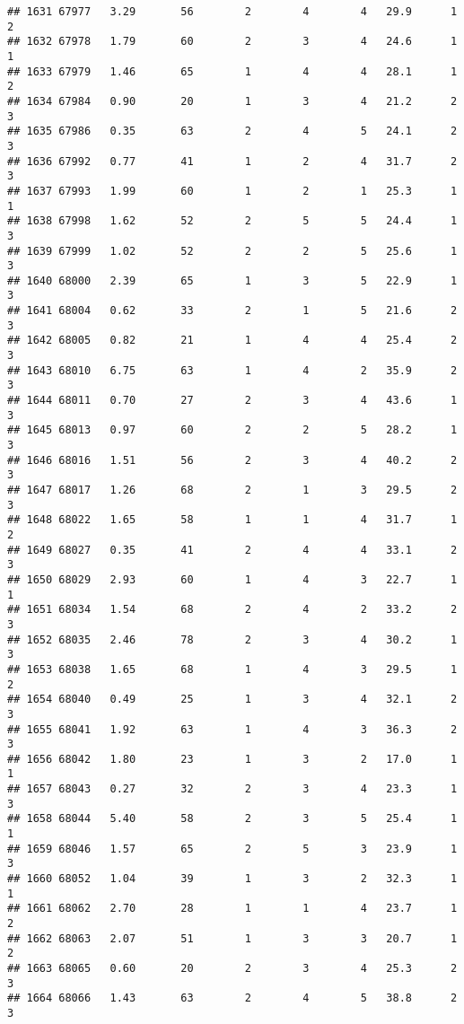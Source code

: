\documentclass[
]{article}
\begin{document}
\begin{verbatim}
## 1631 67977   3.29       56        2        4        4   29.9      1      2
## 1632 67978   1.79       60        2        3        4   24.6      1      1
## 1633 67979   1.46       65        1        4        4   28.1      1      2
## 1634 67984   0.90       20        1        3        4   21.2      2      3
## 1635 67986   0.35       63        2        4        5   24.1      2      3
## 1636 67992   0.77       41        1        2        4   31.7      2      3
## 1637 67993   1.99       60        1        2        1   25.3      1      1
## 1638 67998   1.62       52        2        5        5   24.4      1      3
## 1639 67999   1.02       52        2        2        5   25.6      1      3
## 1640 68000   2.39       65        1        3        5   22.9      1      3
## 1641 68004   0.62       33        2        1        5   21.6      2      3
## 1642 68005   0.82       21        1        4        4   25.4      2      3
## 1643 68010   6.75       63        1        4        2   35.9      2      3
## 1644 68011   0.70       27        2        3        4   43.6      1      3
## 1645 68013   0.97       60        2        2        5   28.2      1      3
## 1646 68016   1.51       56        2        3        4   40.2      2      3
## 1647 68017   1.26       68        2        1        3   29.5      2      3
## 1648 68022   1.65       58        1        1        4   31.7      1      2
## 1649 68027   0.35       41        2        4        4   33.1      2      3
## 1650 68029   2.93       60        1        4        3   22.7      1      1
## 1651 68034   1.54       68        2        4        2   33.2      2      3
## 1652 68035   2.46       78        2        3        4   30.2      1      3
## 1653 68038   1.65       68        1        4        3   29.5      1      2
## 1654 68040   0.49       25        1        3        4   32.1      2      3
## 1655 68041   1.92       63        1        4        3   36.3      2      3
## 1656 68042   1.80       23        1        3        2   17.0      1      1
## 1657 68043   0.27       32        2        3        4   23.3      1      3
## 1658 68044   5.40       58        2        3        5   25.4      1      1
## 1659 68046   1.57       65        2        5        3   23.9      1      3
## 1660 68052   1.04       39        1        3        2   32.3      1      1
## 1661 68062   2.70       28        1        1        4   23.7      1      2
## 1662 68063   2.07       51        1        3        3   20.7      1      2
## 1663 68065   0.60       20        2        3        4   25.3      2      3
## 1664 68066   1.43       63        2        4        5   38.8      2      3

\end{verbatim}
\end{document}
